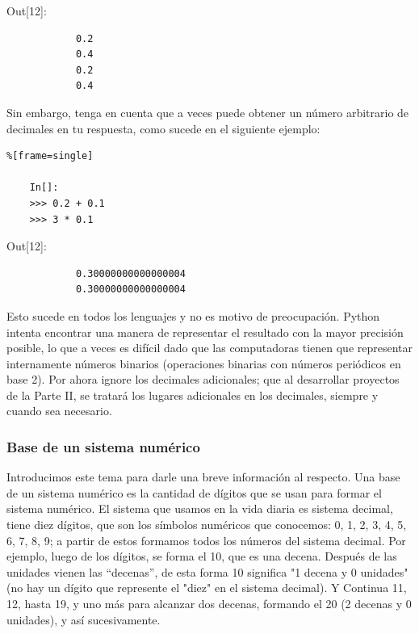 {\ttfamily\scriptsize\scriptsize 
	\hspace{-0.65cm}Out[12]:\vspace{-0.15cm}	
	{\color{blue} 	
		\begin{verbatim}
			0.2
			0.4
			0.2
			0.4
		\end{verbatim}
}}

Sin embargo, tenga en cuenta que a veces puede obtener un número arbitrario de
decimales en tu respuesta, como sucede en el siguiente ejemplo:

\begin{lstlisting}%[frame=single]
	
	In[]:
	>>> 0.2 + 0.1
	>>> 3 * 0.1
\end{lstlisting}

{\ttfamily\scriptsize\scriptsize 
	\hspace{-0.65cm}Out[12]:\vspace{-0.15cm}	
	{\color{blue} 	
		
		\begin{verbatim}
			0.30000000000000004
			0.30000000000000004
		\end{verbatim}
}}

Esto sucede en todos los lenguajes y no es motivo de preocupación. Python intenta
encontrar una manera de representar el resultado con la mayor precisión posible, lo que a veces es
difícil dado que las computadoras tienen que representar internamente números binarios (operaciones binarias con números periódicos en base 2). Por ahora ignore los decimales adicionales; que al  desarrollar  proyectos de la Parte II, se tratará los lugares adicionales en los decimales, siempre y cuando sea necesario.


\subsubsection*{Base de un sistema numérico}

Introducimos este tema para darle una breve información al respecto. Una base de un sistema numérico es la cantidad de dígitos que se usan para formar el sistema numérico.  El  sistema que usamos en la vida diaria es sistema decimal,  tiene diez dígitos, que son los símbolos numéricos  que conocemos: 0, 1, 2, 3, 4, 5, 6, 7, 8, 9; a partir de estos formamos todos los números del sistema decimal.  Por ejemplo, luego de los dígitos, se forma el 10, que es una decena. Después de las unidades vienen las “decenas”, de esta forma  10 significa "{}1 decena y 0 unidades{}" {}(no hay un dígito que represente el "{}diez{}"{} en el sistema decimal). Y Continua  11, 12, hasta 19, y uno más para alcanzar dos decenas,  formando el 20 (2 decenas y 0 unidades), y así sucesivamente. 

